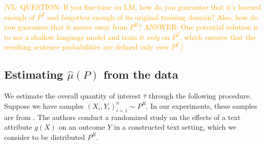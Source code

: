 \documentclass{article}
\newcommand{\vl}[1]{\textcolor{orange}{[VL: #1]}}
\begin{document}
\vl{QUESTION: If you fine-tune an LM, how do you guarantee that it's learned enough of $P^T$ and forgotten enough of its original training domain? Also, how do you guarantee that it moves away from $P^R$?
ANSWER: One potential solution is to use a shallow language model and train it \textit{only} on $P^T$, which ensures that the resulting sentence probabilities are defined only over $P^T$.}

\subsection{Estimating $\hat{\mu}(P)$ from the data}

We estimate the overall quantity of interest $\hat{\tau}$ through the following procedure. Suppose we have samples $(X_i,Y_i)_{i=1}^n \sim P^R$. In our experiments, these samples are from \cite{fong2021causal}. The authors conduct a randomized study on the effects of a text attribute $g(X)$ on an outcome $Y$ in a constructed text setting, which we consider to be distributed $P^R$.
\end{document}
